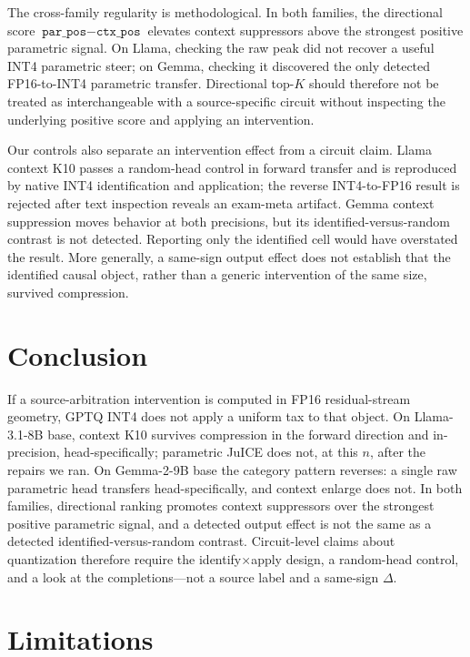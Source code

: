 \documentclass{article} %
\begin{document}
The cross-family regularity is methodological. In both families, the directional score $\texttt{par\_pos}-\texttt{ctx\_pos}$ elevates context suppressors above the strongest positive parametric signal. On Llama, checking the raw peak did not recover a useful INT4 parametric steer; on Gemma, checking it discovered the only detected FP16-to-INT4 parametric transfer. Directional top-$K$ should therefore not be treated as interchangeable with a source-specific circuit without inspecting the underlying positive score and applying an intervention.

Our controls also separate an intervention effect from a circuit claim. Llama context K10 passes a random-head control in forward transfer and is reproduced by native INT4 identification and application; the reverse INT4-to-FP16 result is rejected after text inspection reveals an exam-meta artifact. Gemma context suppression moves behavior at both precisions, but its identified-versus-random contrast is not detected. Reporting only the identified cell would have overstated the result. More generally, a same-sign output effect does not establish that the identified causal object, rather than a generic intervention of the same size, survived compression.


\section{Conclusion}
\label{sec:conclusion}

If a source-arbitration intervention is computed in FP16 residual-stream geometry, GPTQ INT4 does not apply a uniform tax to that object. On Llama-3.1-8B base, context K10 survives compression in the forward direction and in-precision, head-specifically; parametric JuICE does not, at this $n$, after the repairs we ran. On Gemma-2-9B base the category pattern reverses: a single raw parametric head transfers head-specifically, and context enlarge does not. In both families, directional ranking promotes context suppressors over the strongest positive parametric signal, and a detected output effect is not the same as a detected identified-versus-random contrast. Circuit-level claims about quantization therefore require the identify$\times$apply design, a random-head control, and a look at the completions---not a source label and a same-sign $\Delta$.

\section{Limitations}
\label{sec:limitations}
\end{document}
